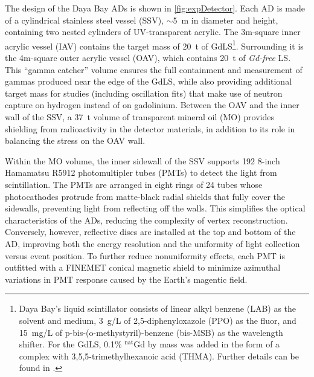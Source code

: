 \documentclass[../thesis.tex]{subfiles}
\begin{document}
The design of the Daya Bay ADs is shown in \autoref{fig:expDetector}. Each AD is
made of a cylindrical stainless steel vessel (SSV), $\sim$5~m in diameter and
height, containing two nested cylinders of UV-transparent acrylic. The 3m-square
inner acrylic vessel (IAV) contains the target mass of 20~t of
GdLS\footnote{Daya Bay's liquid scintillator consists of linear alkyl benzene
  (LAB) as the solvent and medium, 3~g/L of 2,5-diphenyloxazole (PPO) as the
  fluor, and 15~mg/L of p-bis-(o-methystyril)-benzene (bis-MSB) as the
  wavelength shifter. For the GdLS, 0.1\% $^{\text{nat}}$Gd by mass was added in
  the form of a complex with 3,5,5-trimethylhexanoic acid (THMA). Further
  details can be found in \cite{Beriguete_2014}.}. Surrounding it is the
4m-square outer acrylic vessel (OAV), which contains 20~t of \emph{Gd-free}
LS. This ``gamma catcher'' volume ensures the full containment and measurement
of gammas produced near the edge of the GdLS, while also providing additional
target mass for studies (including oscillation fits) that make use of neutron
capture on hydrogen instead of on gadolinium. Between the OAV and the inner wall
of the SSV, a 37~t volume of transparent mineral oil (MO) provides shielding
from radioactivity in the detector materials, in addition to its role in
balancing the stress on the OAV wall.

Within the MO volume, the inner sidewall of the SSV supports 192 8-inch
Hamamatsu R5912 photomultipler tubes (PMTs) to detect the light from
scintillation. The PMTs are arranged in eight rings of 24 tubes whose
photocathodes protrude from matte-black radial shields that fully cover the
sidewalls, preventing light from reflecting off the walls. This simplifies the
optical characteristics of the ADs, reducing the complexity of vertex
reconstruction. Conversely, however, reflective discs are installed at the top
and bottom of the AD, improving both the energy resolution and the uniformity of
light collection versus event position. To further reduce nonuniformity effects,
each PMT is outfitted with a FINEMET conical magnetic shield to minimize
azimuthal variations in PMT response caused by the Earth's magentic field.
\end{document}
